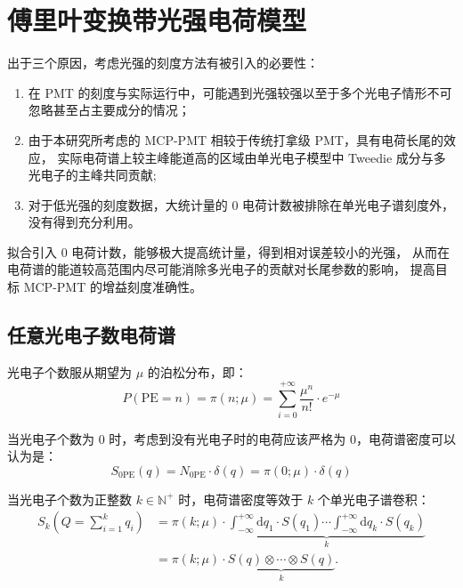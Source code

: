 \section{傅里叶变换带光强电荷模型}\label{sec:fourier}
出于三个原因，考虑光强的刻度方法有被引入的必要性：
\begin{enumerate}
    \item 在 PMT 的刻度与实际运行中，可能遇到光强较强以至于多个光电子情形不可忽略甚至占主要成分的情况；
    \item 由于本研究所考虑的 MCP-PMT 相较于传统打拿级 PMT，具有电荷长尾的效应，
    实际电荷谱上较主峰能道高的区域由单光电子模型中 Tweedie 成分与多光电子的主峰共同贡献;
    \item 对于低光强的刻度数据，大统计量的 0 电荷计数被排除在单光电子谱刻度外，没有得到充分利用。
\end{enumerate}

拟合引入 0 电荷计数，能够极大提高统计量，得到相对误差较小的光强，
从而在电荷谱的能道较高范围内尽可能消除多光电子的贡献对长尾参数的影响，
提高目标 MCP-PMT 的增益刻度准确性。

\subsection{任意光电子数电荷谱}\label{sec:dft}
光电子个数服从期望为 $\mu$ 的泊松分布，即：
\begin{equation}
    P(\text{PE}=n) = \pi(n;\mu)=\sum_{i=0}^{+\infty}\frac{\mu^{n}}{n!}\cdot e^{-\mu}
\end{equation}

当光电子个数为 0 时，考虑到没有光电子时的电荷应该严格为 0，电荷谱密度可以认为是：
\begin{equation}
    S_{0\text{PE}}(q)=N_{0\text{PE}}\cdot\delta(q)=\pi(0;\mu)\cdot\delta(q)
\end{equation}

当光电子个数为正整数 $k\in\mathbb{N}^{+}$ 时，电荷谱密度等效于 $k$ 个单光电子谱卷积：
\begin{equation}
    \begin{aligned}
        S_{k}(Q = \sum_{i = 1}^{k} q_i ) 
        & = \pi(k;\mu)\cdot\underbrace{
        \int_{-\infty }^{+\infty}\mathrm{d}q_1\cdot S(q_1)
        \cdots \int_{-\infty }^{+\infty}\mathrm{d}q_k\cdot S(q_k)
        }_{k}\\
        &=\pi(k;\mu)\cdot\underbrace{S(q)\otimes\cdots\otimes S(q)}_{k}.
    \end{aligned}
    \label{eq:kpe-charge}
\end{equation}


